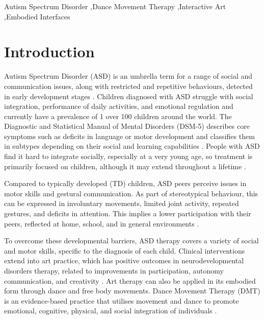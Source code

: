 \documentclass[a4paper,fleqn]{cas-sc}
\begin{document}

\fntext[1]{}

\begin{keywords}
Autism Spectrum Disorder \sep Dance Movement Therapy \sep Interactive Art \sep Embodied Interfaces
\end{keywords}

\maketitle
\section{Introduction} 
\label{sec1:intro}
Autism Spectrum Disorder (ASD) is an umbrella term for a range of social and communication issues, along with restricted and repetitive behaviours, detected in early development stages \cite{Lord20}. Children diagnosed with ASD struggle with social integration, performance of daily activities, and emotional regulation \cite{Lord18} {and currently have a prevalence of 1 over 100 children} \cite{Zeidan22} around the world. The Diagnostic and Statistical Manual of Mental Disorders (DSM-5) describes core symptoms such as deficits in language or motor development and classifies them in subtypes depending on their social and learning capabilities \cite{DSM-5}. People with ASD find it hard to integrate socially, especially at a very young age, so treatment is primarily focused on children, although it may extend throughout a lifetime \cite{Lord20}. 

Compared to typically developed (TD) children, ASD peers perceive issues in motor skills and gestural communication. As part of stereotypical behaviour, this can be expressed in involuntary movements, limited joint activity, repeated gestures, and deficits in attention. This implies a lower participation with their peers, reflected at home, school, and in general environments \cite{Oliveira21}.

To overcome these developmental barriers, ASD therapy covers a variety of social and motor skills, specific to the diagnosis of each child. Clinical interventions extend into art practice, which has positive outcomes in neurodevelopmental disorders therapy, related to improvements in participation, autonomy communication, and creativity \cite{Ortuño22}. Art therapy can also be applied in its embodied form through dance and free body movements. Dance Movement Therapy (DMT) is an evidence-based practice that utilises movement and dance to promote emotional, cognitive, physical, and social integration of individuals \cite{Crooks2021}.
\end{document}
